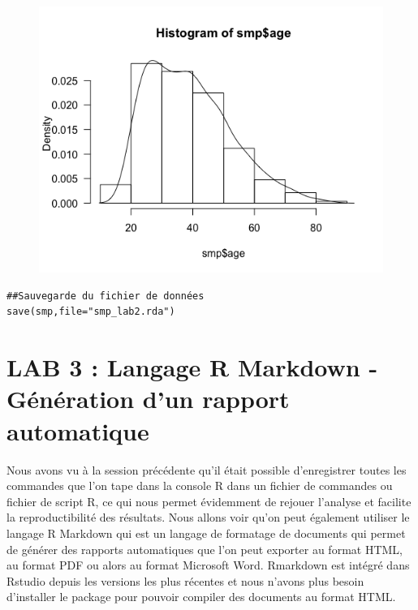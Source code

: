 \begin{figure}[H]\begin{center}\includegraphics[scale=1]{ilu/lab2-8.png}\end{center}\end{figure}
\begin{lstlisting}[language=html]
##Sauvegarde du fichier de données
save(smp,file="smp_lab2.rda")
\end{lstlisting}

\newpage

\section{LAB 3 : Langage R Markdown - Génération d'un rapport automatique}

Nous avons vu à la session précédente qu'il était possible d'enregistrer toutes les commandes que l'on tape dans la console R dans un fichier de commandes ou fichier de script R, ce qui nous permet évidemment de rejouer l'analyse et facilite la reproductibilité des résultats.\newline
Nous allons voir qu'on peut également utiliser le langage R Markdown qui est un langage de formatage de documents qui permet de générer des rapports automatiques que l'on peut exporter au format HTML, au format PDF ou alors au format Microsoft Word.\newline
Rmarkdown est intégré dans Rstudio depuis les versions les plus récentes et nous n'avons plus besoin d'installer le package pour pouvoir compiler des documents au format HTML.

